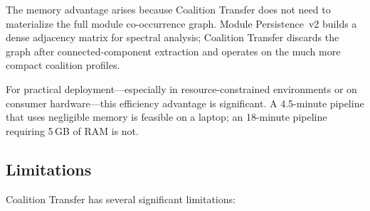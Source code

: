 \documentclass{../yalumba}
\begin{document}
The memory advantage arises because Coalition Transfer does not need to
materialize the full module co-occurrence graph.  Module Persistence~v2 builds
a dense adjacency matrix for spectral analysis; Coalition Transfer discards
the graph after connected-component extraction and operates on the much more
compact coalition profiles.

For practical deployment---especially in resource-constrained environments or
on consumer hardware---this efficiency advantage is significant.  A 4.5-minute
pipeline that uses negligible memory is feasible on a laptop; an 18-minute
pipeline requiring 5\,GB of RAM is not.

\subsection{Limitations}
\label{sec:discussion-limitations}

Coalition Transfer has several significant limitations:
\end{document}
